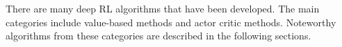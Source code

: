 
There are many deep RL algorithms that have been developed. The main categories include value-based methods and actor critic methods. Noteworthy algorithms from these categories are described in the following sections.




